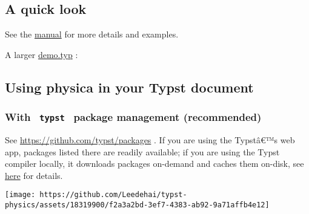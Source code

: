 \subsection{A quick look}\label{a-quick-look}

See the
\href{https://github.com/Leedehai/typst-physics/blob/v0.9.3/physica-manual.pdf}{manual}
for more details and examples.


A larger
\href{https://github.com/Leedehai/typst-physics/blob/master/demo.typ}{demo.typ}
:


\subsection{Using physica in your Typst
document}\label{using-physica-in-your-typst-document}

\subsubsection{\texorpdfstring{With \texttt{\ typst\ } package
management
(recommended)}{With  typst  package management (recommended)}}\label{with-typst-package-management-recommended}

See \url{https://github.com/typst/packages} . If you are using the
Typstâ€™s web app, packages listed there are readily available; if you
are using the Typst compiler locally, it downloads packages on-demand
and caches them on-disk, see
\href{https://github.com/typst/packages\#downloads}{here} for details.

\texttt{[image: https://github.com/Leedehai/typst-physics/assets/18319900/f2a3a2bd-3ef7-4383-ab92-9a71affb4e12]}

\begin{Shaded}
\begin{Highlighting}[]

\end{Highlighting}
\end{Shaded}

